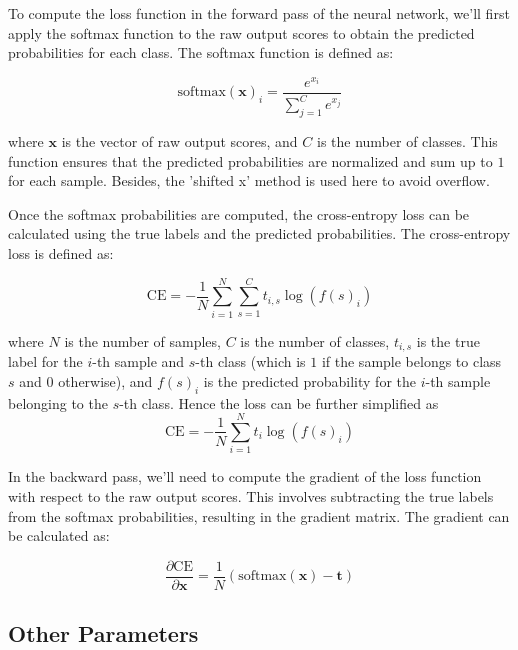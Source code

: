 \documentclass[10pt,a4paper,twoside]{tau}
\renewcommand{\vec}[1]{\mathbf{#1}}
\begin{document}
To compute the loss function in the forward pass of the neural network, we'll first apply the softmax function to the raw output scores to obtain the predicted probabilities for each class. The softmax function is defined as:

\begin{equation}
\text{softmax}(\vec{x})_i = \frac{e^{x_i}}{\sum_{j=1}^{C} e^{x_j}} \tag{3.3.2}
\end{equation}

where $\vec{x}$ is the vector of raw output scores, and $C$ is the number of classes. This function ensures that the predicted probabilities are normalized and sum up to $1$ for each sample. Besides, the 'shifted x' method is used here to avoid overflow.

Once the softmax probabilities are computed, the cross-entropy loss can be calculated using the true labels and the predicted probabilities. The cross-entropy loss is defined as:

\begin{equation}
\text{CE} = -\frac{1}{N} \sum_{i=1}^{N} \sum_{s=1}^{C} t_{i,s} \log(f(s)_i) \tag{3.3.3}
\end{equation}

where $N$ is the number of samples, $C$ is the number of classes, $t_{i,s}$ is the true label for the $i$-th sample and $s$-th class (which is $1$ if the sample belongs to class $s$ and $0$ otherwise), and $f(s)_i$ is the predicted probability for the $i$-th sample belonging to the $s$-th class. Hence the loss can be further simplified as
\begin{equation}
    \text{CE} = -\frac{1}{N} \sum_{i=1}^{N} t_i \log(f(s)_i) \tag{3.3.4}
\end{equation}

In the backward pass, we'll need to compute the gradient of the loss function with respect to the raw output scores. This involves subtracting the true labels from the softmax probabilities, resulting in the gradient matrix. The gradient can be calculated as:

\begin{equation}
\frac{\partial \text{CE}}{\partial \mathbf{x}} = \frac{1}{N} (\text{softmax}(\mathbf{x}) - \mathbf{t}) \tag{3.3.5}
\end{equation}

\subsection{Other Parameters}
\end{document}
